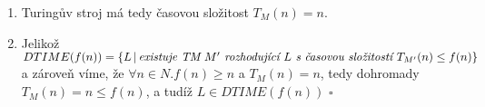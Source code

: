 \documentclass[a4paper]{article}
\begin{document}
\begin{enumerate}
    \item Turingův stroj má tedy časovou složitost $T_M(n)=n$. %
    \item Jelikož $DTIME(f(n)) = \{L\,|\, \emph{existuje TM }M' \emph{ rozhodující }L\emph{ s~časovou složitostí } T_{M'}(n) \leq f(n)\}$ a zároveň
    víme, že $\forall n \in N.f(n) \geq n$ a $T_M(n)=n$, tedy dohromady $T_M(n)=n \leq f(n)$, a tudíž $L\in DTIME(f(n))$ $\square$
\end{enumerate}
\end{document}
